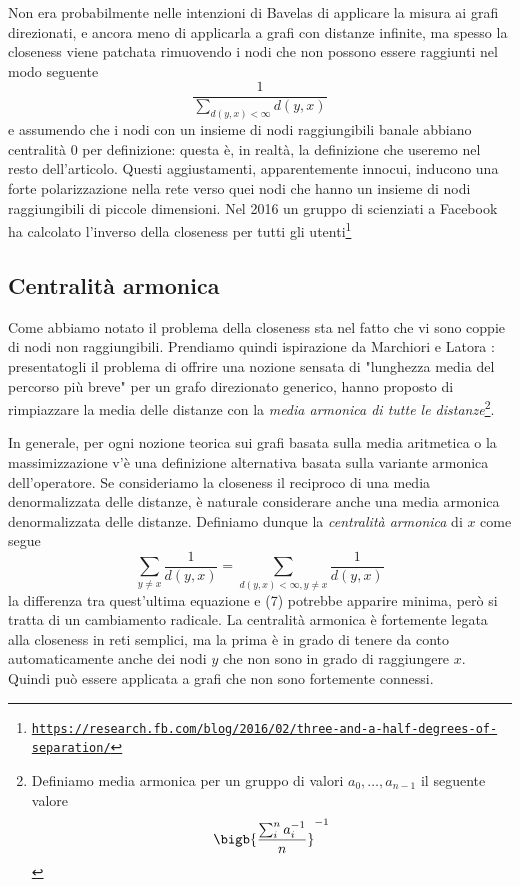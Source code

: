 Non era probabilmente nelle intenzioni di Bavelas di applicare la misura ai grafi direzionati, e ancora meno di applicarla a grafi con distanze infinite, ma spesso la closeness viene patchata rimuovendo i nodi che non possono essere raggiunti nel modo seguente
\begin{equation*}
    \frac{1}{\sum_{d(y, x) < \infty}d(y, x)}
\end{equation*}
e assumendo che i nodi con un insieme di nodi raggiungibili banale abbiano centralità 0 per definizione: questa è, in realtà, la definizione che useremo nel resto dell'articolo. Questi aggiustamenti, apparentemente innocui, inducono una forte polarizzazione nella rete verso quei nodi che hanno un insieme di nodi raggiungibili di piccole dimensioni. Nel 2016 un gruppo di scienziati a Facebook ha calcolato l'inverso della closeness per tutti gli utenti\footnote{\texttt{\href{https://research.fb.com/blog/2016/02/three-and-a-half-degrees-of-separation/}{https://research.fb.com/blog/2016/02/three-and-a-half-degrees-of-separation/}}}
\subsection{Centralità armonica}
Come abbiamo notato il problema della closeness sta nel fatto che vi sono coppie di nodi non raggiungibili. Prendiamo quindi ispirazione da Marchiori e Latora \cite{armonica}: presentatogli il problema di offrire una nozione sensata di "lunghezza media del percorso più breve" per un grafo direzionato generico, hanno proposto di rimpiazzare la media delle distanze con la \textit{media armonica di tutte le distanze}\footnote{Definiamo media armonica per un gruppo di valori $a_0, \dots, a_{n - 1}$ il seguente valore
\begin{equation*}
    \bigb{\frac{\sum_i^n{a_i^{-1}}}{n}}^{-1}
\end{equation*}
}.

In generale, per ogni nozione teorica sui grafi basata sulla media aritmetica o la massimizzazione
v'è una definizione alternativa basata sulla variante armonica dell'operatore. Se consideriamo la closeness il reciproco di una media denormalizzata delle distanze, è naturale considerare anche una media armonica denormalizzata delle distanze. Definiamo dunque la \textit{centralità armonica} di $x$ come segue
\begin{equation}
    \sum_{y \neq x}{\frac{1}{d(y, x)}} = \sum_{d(y, x) < \infty, y \neq x}{\frac{1}{d(y, x)}}
\end{equation}
la differenza tra quest'ultima equazione e (7) potrebbe apparire minima, però si tratta di un cambiamento radicale. La centralità armonica è fortemente legata alla closeness in reti semplici, ma la prima è in grado di tenere da conto automaticamente anche dei nodi $y$ che non sono in grado di raggiungere $x$. Quindi può essere applicata a grafi che non sono fortemente connessi.
